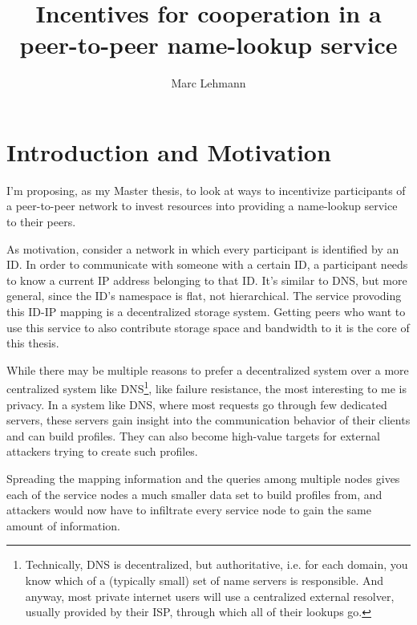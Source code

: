 \documentclass[10pt]{article}
\begin{document}
\title{Incentives for cooperation in a peer-to-peer name-lookup service}
\author{Marc Lehmann}
\date{}
\maketitle

\section*{Introduction and Motivation}
I'm proposing, as my Master thesis, to look at ways to incentivize participants
of a peer-to-peer network to invest resources into providing a name-lookup
service to their peers.

As motivation, consider a network in which every participant is identified by an
ID. In order to communicate with someone with a certain ID, a participant needs
to know a current IP address belonging to that ID. It's similar to DNS, but
more general, since the ID's namespace is flat, not hierarchical. The service
provoding this ID-IP mapping is a decentralized storage system. Getting peers
who want to use this service to also contribute storage space and bandwidth to
it is the core of this thesis.

While there may be multiple reasons to prefer a decentralized system over a more
centralized system like DNS\footnote{Technically, DNS is decentralized, but
authoritative, i.e. for each domain, you know which of a (typically small) set
of name servers is responsible. And anyway, most private internet users will use
a centralized external resolver, usually provided by their ISP, through which
all of their lookups go.}, like failure resistance, the most interesting to me
is privacy. In a system like DNS, where most requests go through few dedicated
servers, these servers gain insight into the communication behavior of their
clients and can build profiles. They can also become high-value targets for
external attackers trying to create such profiles.

Spreading the mapping information and the queries among multiple nodes gives
each of the service nodes a much smaller data set to build profiles from, and
attackers would now have to infiltrate every service node to gain the same
amount of information.
\end{document}
